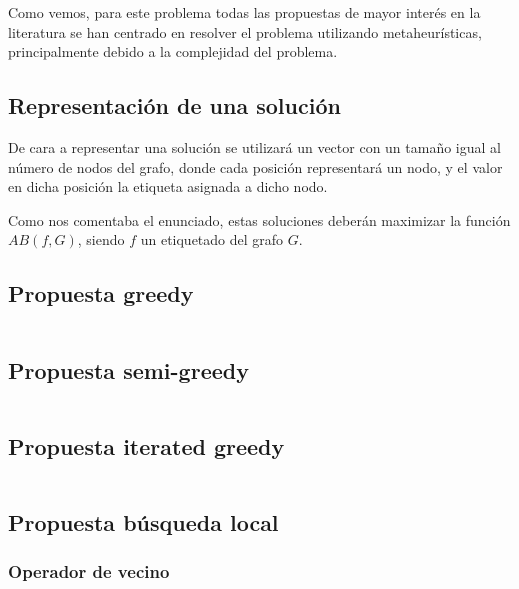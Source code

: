 Como vemos, para este problema todas las propuestas de mayor interés en la literatura se han centrado en resolver el problema utilizando metaheurísticas, principalmente debido a la complejidad del problema.

\subsection{Representación de una solución}

De cara a representar una solución se utilizará un vector con un tamaño igual al número de nodos del grafo, donde cada posición representará un nodo, y el valor en dicha posición la etiqueta asignada a dicho nodo.

Como nos comentaba el enunciado, estas soluciones deberán maximizar la función $AB(f, G)$, siendo $f$ un etiquetado del grafo $G$.

\subsection{Propuesta greedy}

\begin{lstlisting}

\end{lstlisting}

\subsection{Propuesta semi-greedy}

\begin{lstlisting}

\end{lstlisting}

\subsection{Propuesta iterated greedy}

\begin{lstlisting}

\end{lstlisting}

\subsection{Propuesta búsqueda local}

\subsubsection{Operador de vecino}

